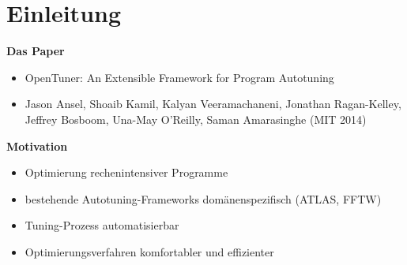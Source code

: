     \tuctwoheadlines

    

    \section{Einleitung}


  \begingroup
    \begin{frame}
    
    \textbf{Das Paper}
    \begin{itemize}
    
        \item OpenTuner: An Extensible Framework for Program Autotuning
        
        \item Jason Ansel, Shoaib Kamil, Kalyan Veeramachaneni, Jonathan Ragan-Kelley, Jeffrey Bosboom, Una-May O'Reilly, Saman Amarasinghe (MIT 2014)
        
    \end{itemize}
    
    \text{}
    
    \textbf{Motivation}
        
    \begin{itemize}
      \item Optimierung rechenintensiver Programme
      
      \item bestehende Autotuning-Frameworks domänenspezifisch (ATLAS, FFTW)
      
      \item Tuning-Prozess automatisierbar
            
    \end{itemize}
    \begin{itemize}
      \item Optimierungsverfahren komfortabler und effizienter
      

\end{itemize}
\end{frame}
